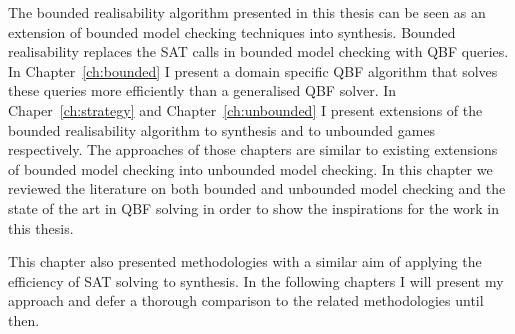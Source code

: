 The bounded realisability algorithm presented in this thesis can be seen as an extension of bounded model checking techniques into synthesis. Bounded realisability replaces the SAT calls in bounded model checking with QBF queries. 
In Chapter~\ref{ch:bounded} I present a domain specific QBF algorithm that solves these queries more efficiently than a generalised QBF solver. In Chaper~\ref{ch:strategy} and Chapter~\ref{ch:unbounded} I present extensions of the bounded realisability algorithm to synthesis and to unbounded games respectively. The approaches of those chapters are similar to existing extensions of bounded model checking into unbounded model checking. In this chapter we reviewed the literature on both bounded and unbounded model checking and the state of the art in QBF solving in order to show the inspirations for the work in this thesis.

This chapter also presented methodologies with a similar aim of applying the efficiency of SAT solving to synthesis. In the following chapters I will present my approach and defer a thorough comparison to the related methodologies until then.
